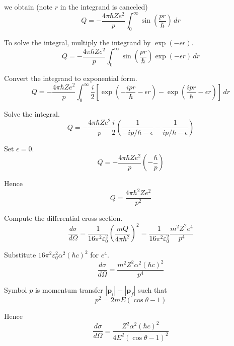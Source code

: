 we obtain (note $r$ in the integrand is canceled)
\begin{equation*}
Q=-\frac{4\pi\hbar Ze^2}{p}
\int_0^\infty\sin\left(\frac{pr}{\hbar}\right)\,dr
\end{equation*}

To solve the integral, multiply the integrand by $\exp(-\epsilon r)$.
\begin{equation*}
Q=-\frac{4\pi\hbar Ze^2}{p}
\int_0^\infty\sin\left(\frac{pr}{\hbar}\right)\exp(-\epsilon r)\,dr
\end{equation*}

Convert the integrand to exponential form.
\begin{equation*}
Q=-\frac{4\pi\hbar Ze^2}{p}
\int_0^\infty\frac{i}{2}\left[
\exp\left(-\frac{ipr}{\hbar}-\epsilon r\right)
-\exp\left(\frac{ipr}{\hbar}-\epsilon r\right)
\right]\,dr
\end{equation*}

Solve the integral.
\begin{equation*}
Q=-\frac{4\pi\hbar Ze^2}{p}\frac{i}{2}
\left(\frac{1}{-ip/\hbar-\epsilon}-\frac{1}{ip/\hbar-\epsilon}\right)
\tag{1}
\end{equation*}

Set $\epsilon=0$.
\begin{equation*}
Q=-\frac{4\pi\hbar Ze^2}{p}\left(-\frac{\hbar}{p}\right)
\end{equation*}

Hence
\begin{equation*}
Q=\frac{4\pi\hbar^2Ze^2}{p^2}
\end{equation*}

Compute the differential cross section.
\begin{equation*}
\frac{d\sigma}{d\Omega}=\frac{1}{16\pi^2\varepsilon_0^2}\left(\frac{mQ}{4\pi\hbar^2}\right)^2
=\frac{1}{16\pi^2\varepsilon_0^2}\frac{m^2Z^2e^4}{p^4}
\tag{2}
\end{equation*}

Substitute $16\pi^2\varepsilon_0^2\alpha^2(\hbar c)^2$ for $e^4$.
\begin{equation*}
\frac{d\sigma}{d\Omega}=\frac{m^2Z^2\alpha^2(\hbar c)^2}{p^4}
\end{equation*}

Symbol $p$ is momentum transfer $|\mathbf p_i|-|\mathbf p_f|$ such that
\begin{equation*}
p^2=2mE(\cos\theta-1)
\end{equation*}

Hence
\begin{equation*}
\frac{d\sigma}{d\Omega}=\frac{Z^2\alpha^2(\hbar c)^2}{4E^2(\cos\theta-1)^2}
\tag{3}
\end{equation*}

